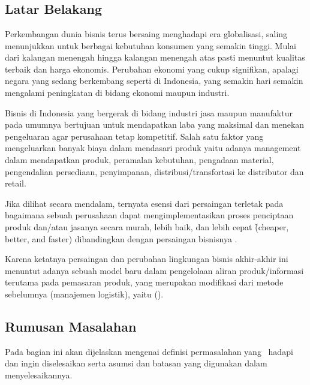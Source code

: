 \chapter{\babSatu}


\section{Latar Belakang}
Perkembangan dunia bisnis terus bersaing menghadapi era globalisasi, saling menunjukkan untuk berbagai kebutuhan konsumen yang semakin tinggi. Mulai dari kalangan menengah hingga kalangan menengah atas pasti menuntut kualitas terbaik dan harga ekonomis. Perubahan ekonomi yang cukup signifikan, apalagi negara yang sedang berkembang seperti di Indonesia, yang semakin hari semakin mengalami peningkatan di bidang ekonomi maupun industri.

Bisnis di Indonesia yang bergerak di bidang industri jasa maupun manufaktur pada umumnya bertujuan untuk mendapatkan laba yang maksimal dan menekan pengeluaran agar perusahaan tetap kompetitif. Salah satu faktor yang mengeluarkan banyak biaya dalam mendasari produk yaitu adanya management dalam mendapatkan produk, peramalan kebutuhan, pengadaan material, pengendalian persediaan, penyimpanan, distribusi/transfortasi ke distributor dan retail.

Jika dilihat secara mendalam, ternyata esensi dari persaingan terletak pada bagaimana sebuah perusahaan dapat mengimplementasikan proses penciptaan produk dan/atau jasanya secara murah, lebih baik, dan lebih cepat \f{(cheaper, better, and faster)} dibandingkan dengan persaingan bisnisnya \cite{Manajemen}.

Karena ketatnya persaingan dan perubahan lingkungan bisnis akhir-akhir ini menuntut adanya sebuah model baru dalam pengelolaan aliran produk/informasi terutama pada pemasaran produk, yang merupakan modifikasi dari metode sebelumnya (manajemen logistik), yaitu \SCM (\scm).



\section{Rumusan Masalahan}
Pada bagian ini akan dijelaskan mengenai definisi permasalahan 
yang \saya~hadapi dan ingin diselesaikan serta asumsi dan batasan 
yang digunakan dalam menyelesaikannya.


